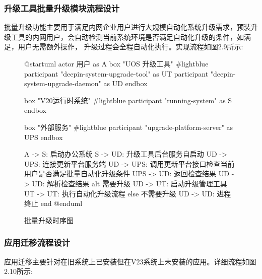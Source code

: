 \documentclass{utart}
\begin{document}
\subsubsection{升级工具批量升级模块流程设计}
批量升级功能主要用于满足内网企业用户进行大规模自动化系统升级需求，预装升级工具的内网用户，会自动检测当前系统环境是否满足自动化升级的条件，如满足，用户无需额外操作，
升级过程会全程自动化执行。实现流程如图2.9所示:
\begin{figure}[H]
    \centering
    \begin{plantuml}
        @startuml
        actor 用户 as A 
        box "UOS 升级工具" #lightblue
        participant "deepin-system-upgrade-tool" as UT
        participant "deepin-system-upgrade-daemon" as UD                             
        endbox

        box "V20运行时系统" #lightblue
        participant "running-system" as S
        endbox
        
        box "外部服务" #lightblue
        participant "upgrade-platform-server" as UPS
        endbox

        A -> S: 启动办公系统
        S -> UD: 升级工具后台服务自启动
        UD -> UPS: 连接更新平台服务端
        UD -> UPS: 调用更新平台接口检查当前用户是否满足批量自动化升级条件
        UPS -> UD: 返回检查结果
        UD -> UD: 解析检查结果
        alt 需要升级
        UD -> UT: 启动升级管理工具
        UT -> UT: 执行自动化升级流程
        else 不需要升级
        UD -> UD: 进程终止
        end        
        @enduml
    \end{plantuml}
    \caption{批量升级时序图}
    \label{fig:mulkupgrade}
\end{figure}

\subsubsection{应用迁移流程设计}
应用迁移主要针对在旧系统上已安装但在V23系统上未安装的应用。详细流程如图2.10所示:
\end{document}
